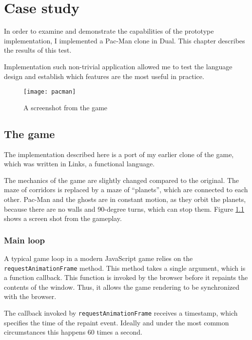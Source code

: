 \chapter{Case study}\label{chap:case}
In order to examine and demonstrate the capabilities of the prototype implementation, I implemented a Pac-Man clone in Dual. This chapter describes the results of this test.

Implementation such non-trivial application allowed me to test the language design and establish which features are the most useful in practice.

\begin{figure}[h!]
    \centering \texttt{[image: pacman]}
    \caption{A screenshot from the game}
    \label{fig:pacman}
\end{figure}

\section{The game}
The implementation described here is a port of my earlier clone of the game, which was written in Links\cite{links_site}, a functional language.

The mechanics of the game are slightly changed compared to the original. The maze of corridors is replaced by a maze of ``planets'', which are connected to each other. Pac-Man and the ghosts are in constant motion, as they orbit the planets, because there are no walls and 90-degree turns, which can stop them. Figure \ref{fig:pacman} shows a screen shot from the gameplay.

\subsection{Main loop}\label{sub:main_loop}
A typical game loop in a modern JavaScript game\cite{mdn_game_anatomy} relies on the \texttt{requestAnimationFrame} method\cite{mdn_requestanimationframe}. This method takes a single argument, which is a function callback. This function is invoked by the browser before it repaints the contents of the window. Thus, it allows the game rendering to be synchronized with the browser.

The callback invoked by \texttt{requestAnimationFrame} receives a timestamp,
which specifies the time of the repaint event. Ideally and under the most common
circumstances this happens 60 times a second.

